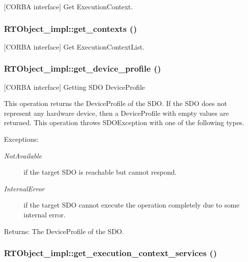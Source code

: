 [CORBA interface] Get Execution\-Context. 

\subsubsection{\setlength{\rightskip}{0pt plus 5cm}RTObject\_\-impl::get\_\-contexts ()}\label{classRTObject__impl_RTObject__impla17}


[CORBA interface] Get Execution\-Context\-List. 

\subsubsection{\setlength{\rightskip}{0pt plus 5cm}RTObject\_\-impl::get\_\-device\_\-profile ()}\label{classRTObject__impl_RTObject__impla39}


[CORBA interface] Getting SDO Device\-Profile 

This operation returns the Device\-Profile of the SDO. If the SDO does not represent any hardware device, then a Device\-Profile with empty values are returned. This operation throws SDOException with one of the following types.

\begin{Desc}
\item[Exceptions:]
\begin{description}
\item[{\em Not\-Available}]if the target SDO is reachable but cannot respond. \item[{\em Internal\-Error}]if the target SDO cannot execute the operation completely due to some internal error. \end{description}
\end{Desc}
\begin{Desc}
\item[Returns:]The Device\-Profile of the SDO.\end{Desc}
\subsubsection{\setlength{\rightskip}{0pt plus 5cm}RTObject\_\-impl::get\_\-execution\_\-context\_\-services ()}\label{classRTObject__impl_RTObject__impla21}


